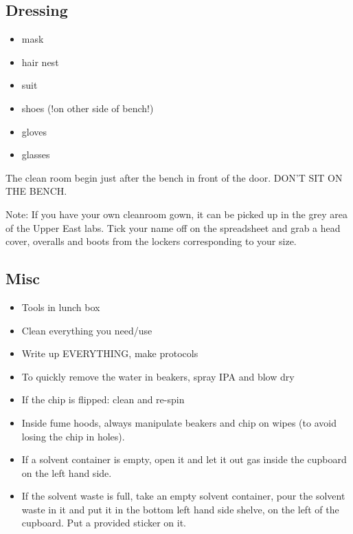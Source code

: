 \newpage

\subsection{Dressing}
\begin{itemize}
\item mask
\item hair nest
\item suit
\item shoes (!on other side of bench!)
\item gloves
\item glasses
\end{itemize}

The clean room begin just after the bench in front of the door. DON'T SIT ON THE BENCH.

Note: If you have your own cleanroom gown, it can be picked up in the grey area of the Upper East labs.
Tick your name off on the spreadsheet and grab a head cover, overalls and boots from the lockers corresponding
to your size.

\subsection{Misc}

\begin{itemize}
\item Tools in lunch box
\item Clean everything you need/use
\item Write up EVERYTHING, make protocols
\item To quickly remove the water in beakers, spray IPA and blow dry
\item If the chip is flipped: clean and re-spin
\item Inside fume hoods, always manipulate beakers and
chip on wipes (to avoid losing the chip in holes).
\item If a solvent container is empty, open it and let it out gas inside
the cupboard on the left hand side.
\item If the solvent waste is full, take an empty solvent container,
pour the solvent waste in it and put it in the bottom left hand
side shelve, on the left of the cupboard. Put a provided sticker
on it.
\end{itemize}

\newpage


